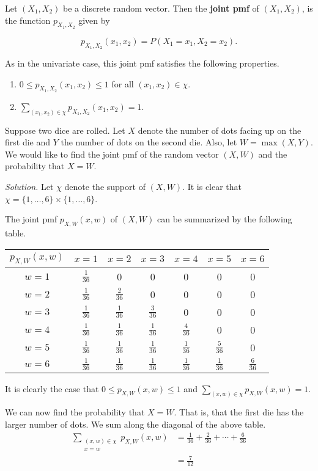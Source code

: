 \begin{definition}
	Let $(X_1,X_2)$ be a discrete random vector. Then the \textbf{joint pmf} of $(X_1,X_2)$, is the function $p_{X_1,X_2}$ given by

	$$p_{X_1,X_2}(x_1,x_2)=P(X_1=x_1,X_2=x_2).$$
\end{definition}

As in the univariate case, this joint pmf satisfies the following properties.
\begin{enumerate}
	\item $0\leq p_{X_1,X_2}(x_1,x_2)\leq 1$ for all $(x_1,x_2)\in\chi$.
	\item $\sum_{(x_1,x_2)\in\chi}p_{X_1,X_2}(x_1,x_2)=1$.
\end{enumerate}

\begin{example}[]
	Suppose two dice are rolled. Let $X$ denote the number of dots facing up on the first die and $Y$ the number of dots on the second die. Also, let $W=\max(X,Y)$. We would like to find the joint pmf of the random vector $(X,W)$ and the probability that $X=W$.

	\textit{Solution.} Let $\chi$ denote the support of $(X,W)$. It is clear that $\chi=\{1,\hdots,6\}\times\{1,\hdots,6\}$.

	The joint pmf $p_{X,W}(x,w)$ of $(X,W)$ can be summarized by the following table.

	\begin{center}
	\begin{tabular}{c | c c c c c c}
		$p_{X,W}(x,w)$ & $x=1$ & $x=2$ & $x=3$ & $x=4$ & $x=5$ & $x=6$\\\hline
		$w=1$ & $\frac{1}{36}$ & 0 & 0 & 0 & 0 & 0\\
		$w=2$ & $\frac{1}{36}$ & $\frac{2}{36}$ & 0 & 0 & 0 & 0\\
		$w=3$ & $\frac{1}{36}$ & $\frac{1}{36}$ & $\frac{3}{36}$ & 0 & 0 & 0\\
		$w=4$ & $\frac{1}{36}$ & $\frac{1}{36}$ & $\frac{1}{36}$ & $\frac{4}{36}$ & 0 & 0\\
		$w=5$ & $\frac{1}{36}$ & $\frac{1}{36}$ & $\frac{1}{36}$ & $\frac{1}{36}$ & $\frac{5}{36}$ & 0\\
		$w=6$ & $\frac{1}{36}$ & $\frac{1}{36}$ & $\frac{1}{36}$ & $\frac{1}{36}$ & $\frac{1}{36}$ & $\frac{6}{36}$
	\end{tabular}
	\end{center}

	It is clearly the case that $0\leq p_{X,W}(x,w)\leq 1$ and $\sum_{(x,w)\in\chi}p_{X,W}(x,w)=1$.

	We can now find the probability that $X=W$. That is, that the first die has the larger number of dots. We sum along the diagonal of the above table.
	\begin{align*}
		\sum_{\substack{(x,w)\in\chi\\x=w}}p_{X,W}(x,w)&=\frac 1{36}+\frac{2}{36}+\cdots+\frac{6}{36}\\
		&=\frac{7}{12}
	\end{align*}

\end{example}

